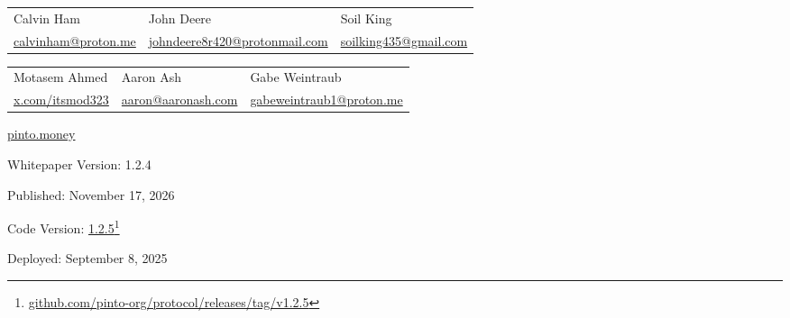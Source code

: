 \documentclass[tikz]{article}
\begin{document}
\begin{titlepage}
\begin{center}
        \vspace*{-0.52cm}

        \begin{center}
            \begin{tabular}{>{\centering\arraybackslash}p{4.6cm} >{\centering\arraybackslash}p{4.6cm} >{\centering\arraybackslash}p{4.6cm}}
                Calvin Ham & John Deere & Soil King \\
                 \href{mailto:calvinham@proton.me}{\normalsize{calvinham@proton.me}} & \href{mailto:johndeere8r420@protonmail.com}{\normalsize{johndeere8r420@protonmail.com}} & \href{mailto:soilking435@gmail.com}{\normalsize{soilking435@gmail.com}}
            \end{tabular}
        \end{center}

        \vspace*{-0.52cm}

        \begin{center}
            \begin{tabular}{>{\centering\arraybackslash}p{4.6cm} >{\centering\arraybackslash}p{4.6cm} >{\centering\arraybackslash}p{4.6cm}}
                Motasem Ahmed & Aaron Ash & Gabe Weintraub \\
                \href{https://x.com/itsmod323}{\normalsize{x.com/itsmod323}} & \href{mailto:aaron@aaronash.com}{\normalsize{aaron@aaronash.com}} & \href{mailto:gabeweintraub1@proton.me}{\normalsize{gabeweintraub1@proton.me}}
            \end{tabular}
        \end{center}


        \normalsize{\href{https://pinto.money/}{pinto.money}}

        \footnotesize{Whitepaper Version:} {\normalsize{1.2.4}}

        \vspace{-0.25cm}
        \footnotesize{Published:} {\normalsize{November 17, 2026}}

        \vspace{-0.25cm}
        \footnotesize{Code Version:} \href{https://github.com/pinto-org/protocol/releases/tag/v1.2.5}{\normalsize{1.2.5}}\footnote{\href{https://github.com/pinto-org/protocol/releases/tag/v1.2.5}{github.com/pinto-org/protocol/releases/tag/v1.2.5}}

        \vspace{-0.25cm}
        \footnotesize{Deployed:} {\normalsize{September 8, 2025}}
        

\end{center}
\end{titlepage}
\end{document}
